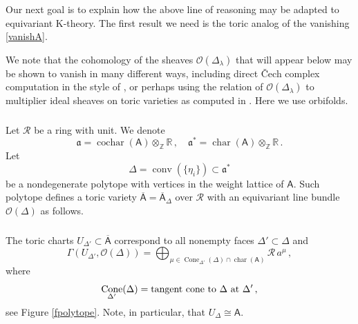 \documentclass[14pt]{extarticle}
\newcommand{\Z}{\mathbb{Z}}
\newcommand{\R}{\mathbb{R}}
\newcommand{\bT}{\mathsf{T}}
\newcommand{\bA}{\mathsf{A}}
\newcommand{\cR}{\mathscr{R}}
\newcommand{\bbA}{\overline{\bA}}
\newcommand{\cO}{\mathscr{O}}
\newcommand{\fa}{\mathfrak{a}}
\DeclareMathOperator{\cochar}{cochar}
\DeclareMathOperator{\cha}{char}
\DeclareMathOperator{\conv}{conv}
\DeclareMathOperator{\Cone}{Cone}
\theoremstyle{definition}
\begin{document}
  \subsubsection{}
  Our next goal is to explain how the above line of reasoning may be
  adapted to equivariant K-theory. The first result we need
  is the toric analog of the vanishing \eqref{vanishA}.

  We note that
  the cohomology of the
  sheaves $\cO(\Delta_\lambda)$ that will appear below may be shown to
  vanish 
  in many different ways, including direct \v Cech complex computation
in the style of \cites{Dan,Ful},
or perhaps using the relation of $\cO(\Delta_\lambda)$ to multiplier ideal sheaves on toric
varieties as computed in \cite{Blickle}. Here we use orbifolds. 
  

  \subsubsection{}
  Let $\cR$ be a ring with unit. 
  We denote
  \begin{equation}
  \fa = \cochar(\bA) \otimes_\Z \R \,, \quad \fa^* = \cha(\bA)
  \otimes_\Z \R \,. 
\label{deffa}
\end{equation}
% 
  Let 
  $$
  \Delta = \conv(\{\eta_i\}) \subset \fa^*
  $$
  be a nondegenerate polytope with vertices in the weight lattice of $\bA$. Such
  polytope defines a toric variety $\bbA = \bbA_\Delta$ over $\cR$
  with an equivariant 
  line bundle $\cO(\Delta)$ as follows. 

  \subsubsection{}


  The toric charts $U_{\Delta'} \subset \bbA$ correspond to all
  nonempty faces $\Delta' \subset \Delta$ and
  \begin{equation}
    \Gamma(U_{\Delta'}, \cO(\Delta)) = \bigoplus_{\mu \in
      \Cone_{\Delta'} (\Delta) \cap \cha(\bA)} \cR \, a^\mu
    \,, \label{GammaU} 
  \end{equation}
  where
  $$
  \Cone_{\Delta'} (\Delta)  = \textup{tangent cone to $\Delta$ at
  $\Delta'$}  \, , 
$$
see Figure \ref{fpolytope}. Note, in particular, that $U_\Delta \cong \bA$.
\end{document}
